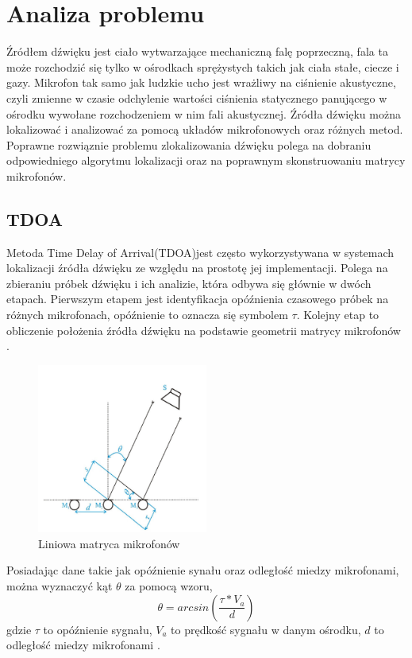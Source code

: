\documentclass[eng,printmode]{mgr}
\begin{document}
\chapter{Analiza problemu}
Źródłem dźwięku jest ciało wytwarzające mechaniczną falę poprzeczną, fala ta może rozchodzić się tylko w ośrodkach sprężystych takich jak ciała stałe, ciecze i gazy. Mikrofon tak samo jak ludzkie ucho jest wrażliwy na ciśnienie akustyczne, czyli zmienne w czasie odchylenie wartości ciśnienia statycznego panującego w ośrodku wywołane rozchodzeniem w nim fali akustycznej. %
Źródła dźwięku można lokalizować i analizować za pomocą układów mikrofonowych oraz różnych metod. Poprawne rozwiąznie problemu zlokalizowania dźwięku polega na dobraniu odpowiedniego algorytmu lokalizacji oraz na poprawnym skonstruowaniu matrycy mikrofonów. 





\section{TDOA}
Metoda Time Delay of Arrival(TDOA)jest często wykorzystywana w systemach lokalizacji źródła dźwięku ze względu na prostotę jej implementacji. Polega na zbieraniu próbek dźwięku i ich analizie, która odbywa się głównie w dwóch etapach. Pierwszym etapem jest identyfikacja opóźnienia czasowego próbek na różnych mikrofonach, opóźnienie to oznacza się symbolem $\tau$. Kolejny etap to obliczenie położenia źródła dźwięku na podstawie geometrii matrycy mikrofonów \cite{seltzer2003microphone}.
\begin{figure}[ht]

    \centering

  \includegraphics[width=0.5\textwidth, angle=0]{matryca.png}

    \caption{Liniowa matryca mikrofonów\cite{seltzer2003microphone}}

    

\end{figure}
\newpage Posiadając dane takie jak  opóźnienie synału oraz odległość miedzy mikrofonami, można wyznaczyć kąt $\theta$ za pomocą wzoru,
\begin{equation}
\theta = arcsin(\frac{\tau*V_{a}}{d}) 
\end{equation}
gdzie $\tau$ to opóźnienie sygnału, $V_{a}$ to prędkość sygnału w danym ośrodku, $d$ to odległość miedzy mikrofonami \cite{seltzer2003microphone}.
\end{document}

